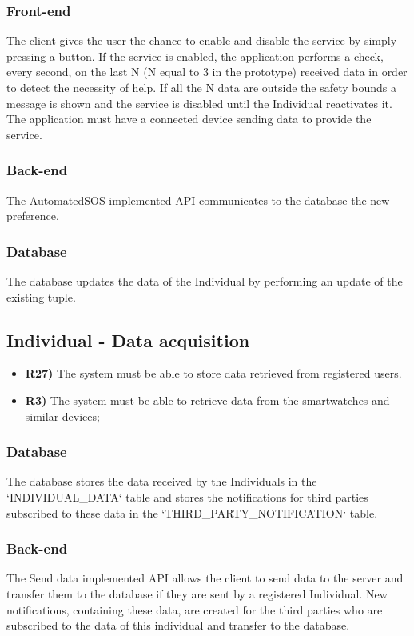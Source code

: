 \subsubsection*{Front-end}
The client gives the user the chance to enable and disable the service by simply pressing a button. If the service is enabled, the application performs a check, every second, on the last N (N equal to 3 in the prototype) received data in order to detect the necessity of help. If all the N data are outside the safety bounds a message is shown and the service is disabled until the Individual reactivates it.
The application must have a connected device sending data to provide the service.

\subsubsection*{Back-end}
The AutomatedSOS implemented API communicates to the database the new preference. 

\subsubsection*{Database}
The database updates the data of the Individual by performing an update of the existing tuple.


\subsection{Individual - Data acquisition}
\begin{itemize}	
	\item {\color{Green}\textbf{R27)}} The system must be able to store data retrieved from registered users.
	\item {\color{Red}\textbf{R3)}} The system must be able to retrieve data from the smartwatches and similar devices;
\end{itemize}

\subsubsection*{Database}
The database stores the data received by the Individuals in the `INDIVIDUAL\_DATA` table and stores the notifications for third parties subscribed to these data in the `THIRD\_PARTY\_NOTIFICATION` table.

\subsubsection*{Back-end}
The Send data implemented API allows the client to send data to the server and transfer them to the database if they are sent by a registered Individual.
New notifications, containing these data, are created for the third parties who are subscribed to the data of this individual and transfer to the database.

